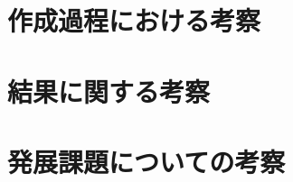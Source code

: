 \documentclass[a4j,11pt]{jarticle}
\begin{document}
\section{作成過程における考察}








\section{結果に関する考察}


\section{発展課題についての考察}
\end{document}

